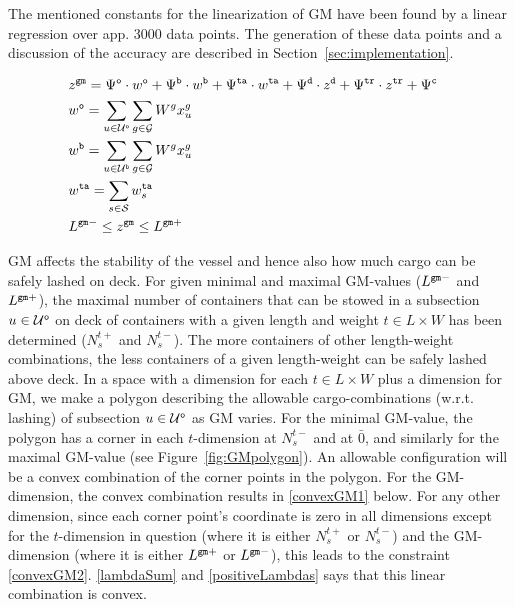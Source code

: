 The mentioned constants for the linearization of GM have been found by a linear regression over app. 3000 data points. %
The generation of these data points and a discussion of the accuracy are described in Section~\ref{sec:implementation}. 

\begin{alignat}{3}    
&z^{\ttt{gm}} 	= \Psi^{\ttt{o}}\cdot w^\ttt{o} + \Psi^{\ttt{b}}\cdot w^\ttt{b} + \Psi^{\ttt{ta}} \cdot w^\ttt{ta}
+ \Psi^{\ttt{d}} \cdot z^{\ttt{d}} + \Psi^{\ttt{tr}} \cdot z^{\ttt{tr}} + \Psi^{\ttt{c}}\quad			\label{defGM}\\
%
&w^\ttt{o} 		= \sum_{u\in \mc{U}^\ttt{o}}\sum_{g\in \mc{G}} W^g x^{g}_{u}	 						\label{defWo} \\
&w^\ttt{b} 		= \sum_{u\in \mc{U}^\ttt{b}}\sum_{g\in \mc{G}} W^g x^{g}_{u} 							\label{defWu} \\
%
&w^\ttt{ta} 	= \sum_{s\in\mc{S}} w^{\ttt{ta}}_{s} 													\label{defWT} \\
%
&L^{\ttt{gm}-} 	\leq z^{\ttt{gm}}	\leq L^{\ttt{gm}+}													\label{minGM}
\end{alignat}    

GM affects the stability of the vessel and hence also how much cargo can be safely lashed on deck. For given minimal and maximal GM-values ($L^{\texttt{gm}-}$ and $L^{\texttt{gm}+}$), the maximal number of containers that can be stowed in a subsection $u\in \mathcal{U}^\texttt{o}$ on deck of containers with a given length and weight $t\in L\times W$ has been determined ($N^{t+}_{s}$ and $N^{t-}_{s}$). The more containers of other length-weight combinations, the less containers of a given length-weight can be safely lashed above deck. 
In a space with a dimension for each $t\in L\times W$ plus a dimension for GM, we make a polygon describing the allowable cargo-combinations (w.r.t. lashing) of subsection $u\in\mathcal{U}^\texttt{o}$ as GM varies. For the minimal GM-value, the polygon has a corner in each $t$-dimension at $N^{t-}_{s}$ and at $\bar{0}$, and similarly for the maximal GM-value (see Figure~\ref{fig:GMpolygon}). %
An allowable configuration will be a convex combination of the corner points in the polygon. %
For the GM-dimension, the convex combination results in \eqref{convexGM1} below. For any other dimension, since each corner point's coordinate is zero in all dimensions except for the $t$-dimension in question (where it is either $N^{t+}_{s}$ or $N^{t-}_{s}$) and the GM-dimension (where it is either $L^{\texttt{gm}+}$ or $L^{\texttt{gm}-}$), this leads to the constraint \eqref{convexGM2}.  \eqref{lambdaSum} and \eqref{positiveLambdas} says that this linear combination is convex. 


